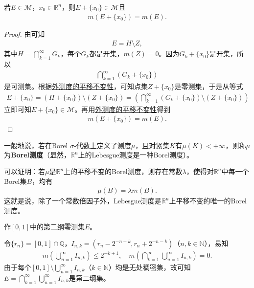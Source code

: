 \documentclass[../../main.tex]{subfiles}%
\begin{document}
\begin{theorem}
若\(E \in \mathscr{M}\)，\(x_0 \in \mathbb{R}^n\)，则\(E + \{x_0\} \in \mathscr{M}\)且
\begin{align*}
m(E + \{x_0\}) = m(E).
\end{align*}
\end{theorem}
\begin{proof}

由可知
\begin{align*}
E = H \setminus Z,
\end{align*}
其中\(H = \bigcap_{k = 1}^{\infty} G_k\)，每个\(G_k\)都是开集，\(m(Z) = 0\)。因为\(G_k + \{x_0\}\)是开集，所以
\begin{align*}
\bigcap_{k = 1}^{\infty} (G_k + \{x_0\})
\end{align*}
是可测集。根据\hyperref[theorem:外测度的平移不变性]{外测度的平移不变性}，可知点集\(Z + \{x_0\}\)是零测集，于是从等式
\begin{align*}
E + \{x_0\}= (H + \{x_0\}) \setminus (Z + \{x_0\})
= \left(\bigcap_{k = 1}^{\infty} (G_k + \{x_0\}) \setminus (Z + \{x_0\})\right)
\end{align*}
立即可知\(E + \{x_0\} \in \mathscr{M}\)。再用\hyperref[theorem:外测度的平移不变性]{外测度的平移不变性}得到
\begin{align*}
m(E + \{x_0\}) = m(E).
\end{align*}

\end{proof}
\begin{remark}
一般地说，若在Borel \(\sigma\)-代数上定义了测度\(\mu\)，且对紧集\(K\)有\(\mu(K)<+\infty\)，则称\(\mu\)为\textbf{Borel测度}（显然，\(\mathbb{R}^n\)上的Lebesgue测度是一种Borel测度）。

可以证明：若\(\mu\)是\(\mathbb{R}^n\)上的平移不变的Borel测度，则存在常数\(\lambda\)，使得对\(\mathbb{R}^n\)中每一个Borel集\(B\)，均有
\begin{align*}
\mu(B)=\lambda m(B).
\end{align*}
这就是说，除了一个常数倍因子外，Lebesgue测度是\(\mathbb{R}^n\)上平移不变的唯一的Borel测度。 
\end{remark}

\begin{example}
作\([0,1]\)中的第二纲零测集\(E\)。
\end{example}
\begin{solution}

令\(\{r_n\}=[0,1]\cap\mathbb{Q}\)，\(I_{n,k}=(r_n - 2^{-n - k},r_n + 2^{-n - k})\)（\(n,k\in\mathbb{N}\)），易知
\begin{align*}
m\left(\bigcup_{n = 1}^{\infty}I_{n,k}\right)\leqslant 2^{-k + 1},\quad
m\left(\bigcap_{k = 1}^{\infty}\bigcup_{n = 1}^{\infty}I_{n,k}\right)= 0.
\end{align*}
由于每个\([0,1]\setminus\bigcup_{n = 1}^{\infty}I_{n,k}\)（\(k\in\mathbb{N}\)）均是无处稠密集，故可知\(E = \bigcap_{k = 1}^{\infty}\bigcup_{n = 1}^{\infty}I_{n,k}\)是第二纲集。

\end{solution}
\end{document}
